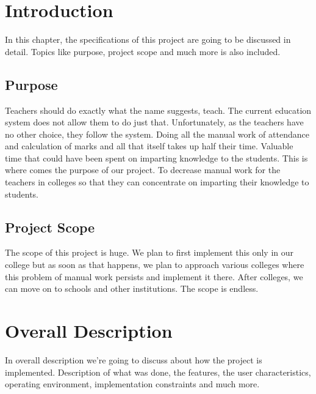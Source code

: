 \documentclass[BTech]{srmuthesis}
\begin{document}
\section{Introduction}
In this chapter, the specifications of this project are going to be discussed in detail. Topics like purpose, project scope and much more is also included.
\subsection{Purpose}
Teachers should do exactly what the name suggests, teach. The current education system does not allow them to do just that. Unfortunately, as the teachers have no other choice, they follow the system. Doing all the manual work of attendance and calculation of marks and all that itself takes up half their time. Valuable time that could have been spent on imparting knowledge to the students. This is where comes the purpose of our project. To decrease manual work for the teachers in colleges so that they can concentrate on imparting their knowledge to students.
\subsection{Project Scope}
The scope of this project is huge. We plan to first implement this only in our college but as soon as that happens, we plan to approach various colleges where this problem of manual work persists and implement it there. After colleges, we can move on to schools and other institutions. The scope is endless.  
\section{Overall Description}
In overall description we're going to discuss about how the project is implemented. Description of what was done, the features, the user characteristics, operating environment, implementation constraints and much more.
\end{document}
